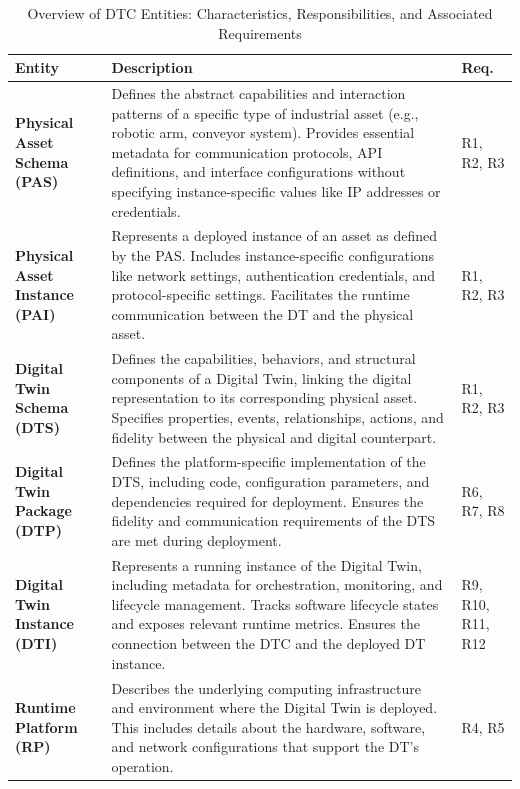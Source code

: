 \begin{table}
    \centering
    \small
    \begin{tabular}{p{2cm} p{8.5cm} p{2cm}}
    \toprule
    \textbf{Entity} & \textbf{Description} & \textbf{Req.} \\
    \hline
    \textbf{Physical Asset Schema (PAS)} & Defines the abstract capabilities and interaction patterns of a specific type of industrial asset (e.g., robotic arm, conveyor system). Provides essential metadata for communication protocols, API definitions, and interface configurations without specifying instance-specific values like IP addresses or credentials. & R1, R2, R3 \\ \hline
    \textbf{Physical Asset Instance (PAI)} & Represents a deployed instance of an asset as defined by the PAS. Includes instance-specific configurations like network settings, authentication credentials, and protocol-specific settings. Facilitates the runtime communication between the DT and the physical asset. & R1, R2, R3 \\ \hline
    \textbf{Digital Twin Schema (DTS)} & Defines the capabilities, behaviors, and structural components of a Digital Twin, linking the digital representation to its corresponding physical asset. Specifies properties, events, relationships, actions, and fidelity between the physical and digital counterpart. & R1, R2, R3 \\ \hline
    \textbf{Digital Twin Package (DTP)} & Defines the platform-specific implementation of the DTS, including code, configuration parameters, and dependencies required for deployment. Ensures the fidelity and communication requirements of the DTS are met during deployment. & R6, R7, R8 \\ \hline
    \textbf{Digital Twin \-  Instance (DTI)} & Represents a running instance of the Digital Twin, including metadata for orchestration, monitoring, and lifecycle management. Tracks software lifecycle states and exposes relevant runtime metrics. Ensures the connection between the DTC and the deployed DT instance. & R9, R10, R11, R12 \\
    \hline
    \textbf{Runtime Platform (RP)} & Describes the underlying computing infrastructure and environment where the Digital Twin is deployed. This includes details about the hardware, software, and network configurations that support the DT's operation. & R4, R5 \\
    \bottomrule
    \end{tabular}
    \caption{Overview of DTC Entities: Characteristics, Responsibilities, and Associated Requirements}
    \label{table:dtc_descriptions_requirements}
\end{table}


